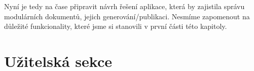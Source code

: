 Nyní je tedy na čase připravit návrh řešení aplikace, která by zajistila správu modulárních dokumentů, jejich generování/publikaci. Nesmíme zapomenout na důležité funkcionality,
které jsme si stanovili v první části této kapitoly.

\section{Užitelská sekce}